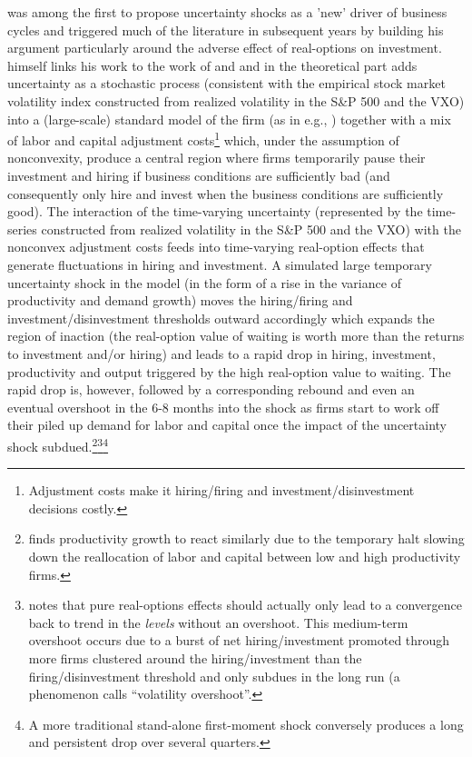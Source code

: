 \documentclass[a4paper,11pt,listof=nochaptergap,oneside,pointednumbers,bibtotoc,bigheadings,liststotoc]{scrbook}
\theoremstyle{mysatz}
\theoremstyle{mydefinition}
\theoremstyle{mytheorem}
\theoremstyle{mybemerkung}
\begin{document}
\citet{bloom:09} was among the first to propose uncertainty shocks as a 'new' driver of business cycles and triggered much of the literature in subsequent years by building his argument particularly around the adverse effect of real-options on investment. \citet{bloom:09} himself links his work to the work of \citet{bernanke:83} and \citet{hassler:96} and in the theoretical part adds uncertainty as a stochastic process (consistent with the empirical stock market volatility index constructed from realized volatility in the S\&P 500 and the VXO) into a (large-scale) standard model of the firm (as in e.g., \citealp{abelandeberly:96}) together with a mix of labor and capital adjustment costs\footnote{Adjustment costs make it hiring/firing and investment/disinvestment decisions costly.} which, under the assumption of nonconvexity, produce a central region where firms temporarily pause their investment and hiring if business conditions are sufficiently bad (and consequently only hire and invest when the business conditions are sufficiently good). The interaction of the time-varying uncertainty (represented by the time-series constructed from realized volatility in the S\&P 500 and the VXO) with the nonconvex adjustment costs feeds into time-varying real-option effects that generate fluctuations in hiring and investment. A simulated large temporary uncertainty shock in the model (in the form of a rise in the variance of productivity and demand growth) moves the hiring/firing and investment/disinvestment thresholds outward accordingly which expands the region of inaction (the real-option value of waiting is worth more than the returns to investment and/or hiring) and leads to a rapid drop in hiring, investment, productivity and output triggered by the high real-option value to waiting. The rapid drop is, however, followed by a corresponding rebound and even an eventual overshoot in the 6-8 months into the shock as firms start to work off their piled up demand for labor and capital once the impact of the uncertainty shock subdued.\footnote{\citet{bloom:09} finds productivity growth to react similarly due to the temporary halt slowing down the reallocation of labor and capital between low and high productivity firms.}\footnote{\citet[p. 646]{bloom:09} notes that pure real-options effects should actually only lead to a convergence back to trend in the \textit{levels} without an overshoot. This medium-term overshoot occurs due to a burst of net hiring/investment promoted through more firms clustered around the hiring/investment than the firing/disinvestment threshold and only subdues in the long run (a phenomenon \citet{bloom:09} calls ``volatility overshoot''.}\footnote{A more traditional stand-alone first-moment shock conversely produces a long and persistent drop over several quarters.} 
\end{document}
